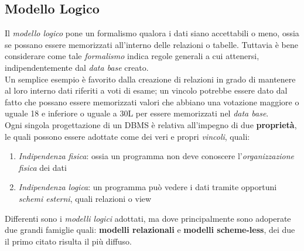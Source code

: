 \documentclass{article}
\begin{document}
\subsection*{Modello Logico}
\large 
Il \textit{modello logico} pone un formalismo qualora i dati siano accettabili o meno, ossia se possano essere memorizzati all'interno delle relazioni o tabelle. Tuttavia è bene considerare come tale \textit{formalismo} indica regole generali a cui attenersi, indipendentemente dal \textit{data base} creato.\vspace{14pt}\\Un semplice esempio è favorito dalla creazione di relazioni in grado di mantenere al loro interno dati riferiti a voti di esame; un vincolo potrebbe essere dato dal fatto che possano essere memorizzati valori che abbiano una votazione maggiore o uguale 18 e inferiore o uguale a 30L per essere memorizzati nel \textit{data base}.
\vspace{14pt}\\Ogni singola progettazione di un DBMS è relativa all'impegno di due \textbf{proprietà}, le quali possono essere adottate come dei veri e propri \textit{vincoli}, quali:
\begin{enumerate}
    \renewcommand{\labelenumi}{-}
    \itemsep0em
    \item \textit{Indipendenza fisica}: ossia un programma non deve conoscere l'\textit{organizzazione fisica} dei dati
    \item \textit{Indipendenza logica}: un programma può vedere i dati tramite opportuni \textit{schemi esterni}, quali relazioni o view
\end{enumerate}
Differenti sono i \textit{modelli logici} adottati, ma dove principalmente sono adoperate due grandi famiglie quali: \textbf{modelli relazionali} e \textbf{modelli scheme-less}, dei due il primo citato risulta il più diffuso.
\end{document}
